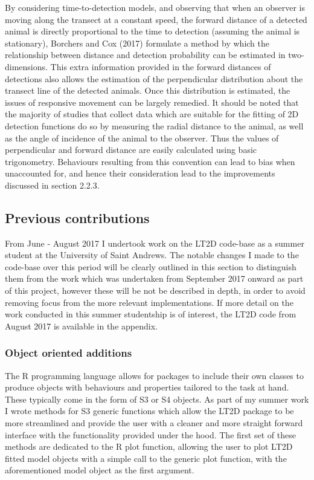 \documentclass[11pt]{article}
\begin{document}
\begin{multicols}{2}
By considering time-to-detection models, and observing that when an observer is moving along the transect at a constant speed, the forward distance of a detected animal is directly proportional to the time to detection (assuming the animal is stationary), Borchers and Cox (2017) formulate a method by which the relationship between distance and detection probability can be estimated in two-dimensions. This extra information provided in the forward distances of detections also allows the estimation of the perpendicular distribution about the transect line of the detected animals. Once this distribution is estimated, the issues of responsive movement can be largely remedied. It should be noted that the majority of studies that collect data which are suitable for the fitting of 2D detection functions do so by measuring the radial distance to the animal, as well as the angle of incidence of the animal to the observer. Thus the values of perpendicular and forward distance are easily calculated using basic trigonometry. Behaviours resulting from this convention can lead to bias when unaccounted for, and hence their consideration lead to the improvements discussed in section 2.2.3. 

\subsection{Previous contributions}

From June - August 2017 I undertook work on the LT2D code-base as a summer student at the University of Saint Andrews. The notable changes I made to the code-base over this period will be clearly outlined in this section to distinguish them from the work which was undertaken from September 2017 onward as part of this project, however these will be not be described in depth, in order to avoid removing focus from the more relevant implementations. If more detail on the work conducted in this summer studentship is of interest, the LT2D code from August 2017 is available in the appendix. 

\subsubsection{Object oriented additions}
The R programming language allows for packages to include their own classes to produce objects with behaviours and properties tailored to the task at hand. These typically come in the form of S3 or S4 objects. As part of my summer work I wrote methods for S3 generic functions which allow the LT2D package to be more streamlined and provide the user with a cleaner and more straight forward interface with the functionality provided under the hood. The first set of these methods are dedicated to the R plot function, allowing the user to plot LT2D fitted model objects with a simple call to the generic plot function, with the aforementioned model object as the first argument. 


\end{multicols}
\end{document}
